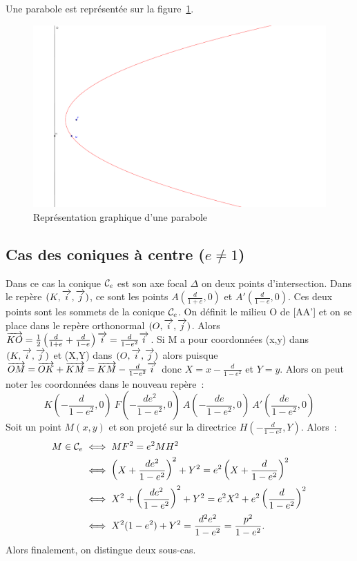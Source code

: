 Une parabole est représentée sur la figure~\ref{fig:parabole}.

\begin{figure}[!h]
  \centering
  \includegraphics[width=\textwidth, scale=1]{parabole.png}
  \caption{Représentation graphique d'une parabole}
  \label{fig:parabole}
\end{figure}


\subsection{Cas des coniques à centre ($e\neq 1$)}
Dans ce cas la conique $\mathcal{C}_{e}$ est son axe focal $\Delta$ on deux points d'intersection. Dans le repère $(K,\overrightarrow{i},\overrightarrow{j})$, ce sont les points $A(\frac{d}{1+e},0)$ et $A'(\frac{d}{1-e},0)$. Ces deux points sont les sommets de la conique $\mathcal{C}_{e}$. On définit le milieu O de [AA'] et on se place dans le repère orthonormal $(O,\overrightarrow{i},\overrightarrow{j})$. Alors $\overrightarrow{KO}=\frac{1}{2}\left(\frac{d}{1+e}+\frac{d}{1-e}\right)\overrightarrow{i}=\frac{d}{1-e^2}\overrightarrow{i}$. Si M a pour coordonnées (x,y) dans $(K,\overrightarrow{i},\overrightarrow{j})$ et (X,Y) dans $(O,\overrightarrow{i},\overrightarrow{j})$ alors puisque $\overrightarrow{OM}=\overrightarrow{OK}+\overrightarrow{KM}=\overrightarrow{KM}-\frac{d}{1-e^2}\overrightarrow{i}$ donc $X=x-\frac{d}{1-e^2}$ et $Y=y$. Alors on peut noter les coordonnées dans le nouveau repère~:
\begin{equation}
  K\left(-\frac{d}{1-e^2},0\right) \ F\left(-\frac{de^2}{1-e^2},0\right) \ A\left(-\frac{de}{1-e^2},0\right) \ A'\left(\frac{de}{1-e^2},0\right)
\end{equation}
Soit un point $M(x,y)$ et son projeté sur la directrice $H\left(-\frac{d}{1-e^2},Y\right)$. Alors~:
\begin{align}
  M \in \mathcal{C}_{e} &\iff MF^2=e^2 MH^2\\
  &\iff \left(X+\frac{de^2}{1-e^2}\right)^2+Y^2=e^2 \left(X+\frac{d}{1-e^2}\right)^2\\
  &\iff X^2+\left(\frac{de^2}{1-e^2}\right)^2+Y^2=e^2 X^2+e^2\left(\frac{d}{1-e^2}\right)^2\\
&\iff X^2(1-e^2)+Y^2=\frac{d^2e^2}{1-e^2}=\frac{p^2}{1-e^2}.
\end{align}
Alors finalement, on distingue deux sous-cas.

